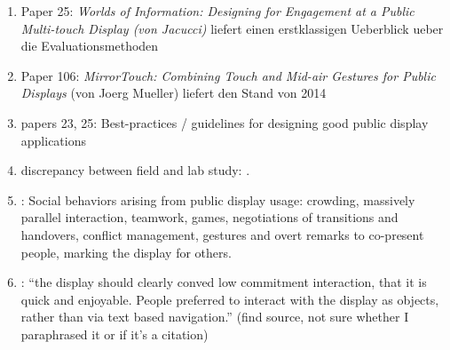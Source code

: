 	\begin{enumerate}
	\item Paper 25: \textit{Worlds of Information: Designing for Engagement at a Public Multi-touch Display (von Jacucci)} liefert einen erstklassigen Ueberblick ueber die Evaluationsmethoden
	\item Paper 106: \textit{MirrorTouch: Combining Touch and Mid-air Gestures for Public Displays} (von Joerg Mueller) liefert den Stand von 2014

	\item papers 23, 25: Best-practices / guidelines for designing good public display applications

	\item discrepancy between field and lab study: \cite{Ojala2011}.

	\item : Social behaviors arising from public display usage: crowding, massively parallel interaction, teamwork, games, negotiations of transitions and handovers, conflict management, gestures and overt remarks to co-present people, marking the display for others. \cite{peltonen2008s}

	\item \cite{redhead2009designing}: ``the display should clearly conved low commitment interaction, that it is quick and enjoyable. People preferred to interact with the display as objects, rather than via text based navigation.'' (find source, not sure whether I paraphrased it or if it's a citation)

	\end{enumerate}
